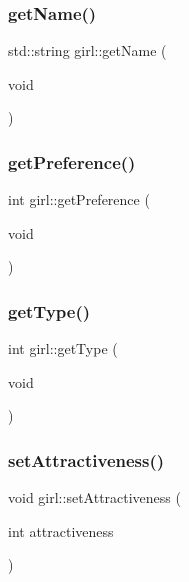 \mbox{\label{classgirl_ae0499077a33b4a517867f431bccfe93a}} 
\subsubsection{\texorpdfstring{get\+Name()}{getName()}}
{\footnotesize\ttfamily std\+::string girl\+::get\+Name (\begin{DoxyParamCaption}\item[{void}]{ }\end{DoxyParamCaption})}

\mbox{\label{classgirl_a445487f05d077114171887781a12e151}} 
\subsubsection{\texorpdfstring{get\+Preference()}{getPreference()}}
{\footnotesize\ttfamily int girl\+::get\+Preference (\begin{DoxyParamCaption}\item[{void}]{ }\end{DoxyParamCaption})}

\mbox{\label{classgirl_ac0eb402f33a9b066a89ae0eeda483ea4}} 
\subsubsection{\texorpdfstring{get\+Type()}{getType()}}
{\footnotesize\ttfamily int girl\+::get\+Type (\begin{DoxyParamCaption}\item[{void}]{ }\end{DoxyParamCaption})}

\mbox{\label{classgirl_a631115234a7e2ca7b497856e32c4ee7b}} 
\subsubsection{\texorpdfstring{set\+Attractiveness()}{setAttractiveness()}}
{\footnotesize\ttfamily void girl\+::set\+Attractiveness (\begin{DoxyParamCaption}\item[{int}]{attractiveness }\end{DoxyParamCaption})}

